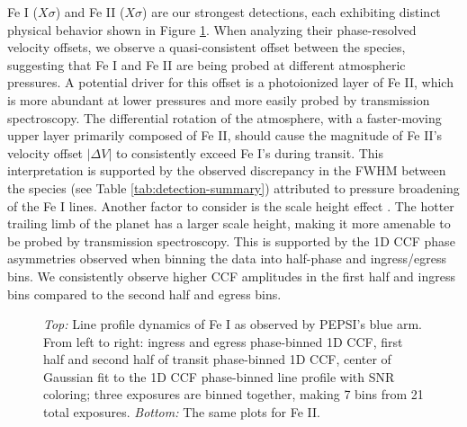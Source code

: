 \documentclass[twocolumn]{aastex631}
\begin{document}
            Fe I ($X\sigma$) and Fe II ($X\sigma$) are our strongest detections, each exhibiting distinct physical behavior shown in Figure \ref{fig:phase-binned-1d-ccfs-Fe/Fe+}. When analyzing their phase-resolved velocity offsets, we observe a quasi-consistent offset between the species, suggesting that Fe I and Fe II are being probed at different atmospheric pressures. A potential driver for this offset is a photoionized layer of Fe II, which is more abundant at lower pressures and more easily probed by transmission spectroscopy. The differential rotation of the atmosphere, with a faster-moving upper layer primarily composed of Fe II, should cause the magnitude of Fe II's velocity offset $|\Delta V|$ to consistently exceed Fe I's during transit. This interpretation is supported by the observed discrepancy in the FWHM between the species (see Table \ref{tab:detection-summary}) attributed to pressure broadening of the Fe I lines. Another factor to consider is the scale height effect \citep{Savel2023}. The hotter trailing limb of the planet has a larger scale height, making it more amenable to be probed by transmission spectroscopy. This is supported by the 1D CCF phase asymmetries observed when binning the data into half-phase and ingress/egress bins. We consistently observe higher CCF amplitudes in the first half and ingress bins compared to the second half and egress bins.

            

            

            

        \begin{figure} \label{fig:phase-binned-1d-ccfs-Fe/Fe+}
            \centering
            \caption{\textit{Top:} Line profile dynamics of Fe I as observed by PEPSI's blue arm. From left to right: ingress and egress phase-binned 1D CCF, first half and second half of transit phase-binned 1D CCF, center of Gaussian fit to the 1D CCF phase-binned line profile with SNR coloring; three exposures are binned together, making 7 bins from 21 total exposures. \textit{Bottom:} The same plots for Fe II.}
        \end{figure}
\end{document}
